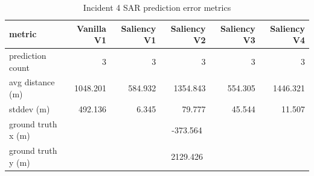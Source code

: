 \begin{table}[ht]
\centering
\caption{Incident 4 SAR prediction error metrics}
\label{tab:sar-incident-4}
\begin{tabular}{lrrrrr}
\hline
metric & Vanilla V1 & Saliency V1 & Saliency V2 & Saliency V3 & Saliency V4 \\
\hline
prediction count & 3 & 3 & 3 & 3 & 3 \\
avg distance (m) & 1048.201 & 584.932 & 1354.843 & 554.305 & 1446.321 \\
stddev (m) & 492.136 & 6.345 & 79.777 & 45.544 & 11.507 \\
ground truth x (m) & \multicolumn{5}{c}{-373.564} \\
ground truth y (m) & \multicolumn{5}{c}{2129.426} \\
\hline
\end{tabular}
\end{table}

